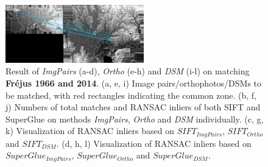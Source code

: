 \begin{figure}[htbp]
\begin{center}
{\begin{minipage}[t]{0.48\linewidth}
				\centering
				\includegraphics[width=6cm]{images/Chapitre3/Homol-SIFT2Step-Rough-2DRANSAC_MEC-Malt_Tapas_1966_MEC-Malt_2014.png}
			\end{minipage}%
		}
		\caption{{\scriptsize Result of \textit{ImgPairs} (a-d), \textit{Ortho} (e-h) and \textit{DSM} (i-l) on matching \textbf{Fr{\'e}jus 1966 and 2014}. (a, e, i) Image pairs/orthophotos/DSMs to be matched, with red rectangles indicating the common zone. (b, f, j) Numbers of total matches and RANSAC inliers of both SIFT and SuperGlue on methods \textit{ImgPairs}, \textit{Ortho} and \textit{DSM} individually. (c, g, k) Visualization of RANSAC inliers based on $SIFT_{ImgPairs}$, $SIFT_{Ortho}$ and $SIFT_{DSM}$. (d, h, l) Visualization of RANSAC inliers based on $SuperGlue_{ImgPairs}$, $SuperGlue_{Ortho}$ and $SuperGlue_{DSM}$.}}
		\label{MatchVizFrejus1966DSM}
	\end{center}
\end{figure} 




